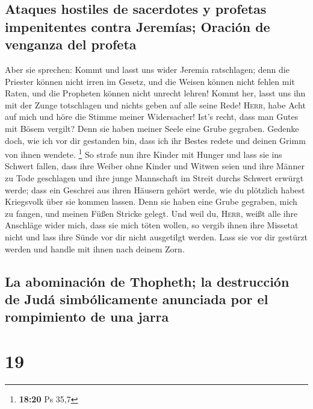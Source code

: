 \hypertarget{ataques-hostiles-de-sacerdotes-y-profetas-impenitentes-contra-jeremuxedas-oraciuxf3n-de-venganza-del-profeta}{%
\subsection{Ataques hostiles de sacerdotes y profetas impenitentes
contra Jeremías; Oración de venganza del
profeta}\label{ataques-hostiles-de-sacerdotes-y-profetas-impenitentes-contra-jeremuxedas-oraciuxf3n-de-venganza-del-profeta}}

 Aber sie sprechen: Kommt und lasst uns wider Jeremia
ratschlagen; denn die Priester können nicht irren im Gesetz, und die
Weisen können nicht fehlen mit Raten, und die Propheten können nicht
unrecht lehren! Kommt her, lasst uns ihn mit der Zunge totschlagen und
nichts geben auf alle seine Rede!  \textsc{Herr}, habe
Acht auf mich und höre die Stimme meiner Widersacher! 
Ist's recht, dass man Gutes mit Bösem vergilt? Denn sie haben meiner
Seele eine Grube gegraben. Gedenke doch, wie ich vor dir gestanden bin,
dass ich ihr Bestes redete und deinen Grimm von ihnen wendete.
\footnote{\textbf{18:20} Ps 35,7}  So strafe nun ihre
Kinder mit Hunger und lass sie ins Schwert fallen, dass ihre Weiber ohne
Kinder und Witwen seien und ihre Männer zu Tode geschlagen und ihre
junge Mannschaft im Streit durchs Schwert erwürgt werde; 
dass ein Geschrei aus ihren Häusern gehört werde, wie du plötzlich
habest Kriegsvolk über sie kommen lassen. Denn sie haben eine Grube
gegraben, mich zu fangen, und meinen Füßen Stricke gelegt.
 Und weil du, \textsc{Herr}, weißt alle ihre Anschläge
wider mich, dass sie mich töten wollen, so vergib ihnen ihre Missetat
nicht und lass ihre Sünde vor dir nicht ausgetilgt werden. Lass sie vor
dir gestürzt werden und handle mit ihnen nach deinem Zorn.

\hypertarget{la-abominaciuxf3n-de-thopheth-la-destrucciuxf3n-de-juduxe1-simbuxf3licamente-anunciada-por-el-rompimiento-de-una-jarra}{%
\subsection{La abominación de Thopheth; la destrucción de Judá
simbólicamente anunciada por el rompimiento de una
jarra}\label{la-abominaciuxf3n-de-thopheth-la-destrucciuxf3n-de-juduxe1-simbuxf3licamente-anunciada-por-el-rompimiento-de-una-jarra}}

\hypertarget{section-18}{%
\section{19}\label{section-18}}

